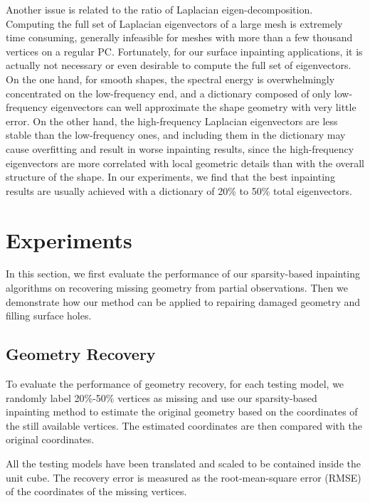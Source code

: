 Another issue is related to the ratio of Laplacian eigen-decomposition.
Computing the full set of Laplacian eigenvectors of a large mesh is
extremely time consuming, generally infeasible for meshes with more than a few
thousand vertices on a regular PC. Fortunately, for our surface inpainting
applications, it is actually not necessary or even desirable to compute the
full set of eigenvectors. On the one hand, for smooth shapes, the spectral
energy is overwhelmingly concentrated on the low-frequency end, and a
dictionary composed of only low-frequency eigenvectors can well approximate the
shape geometry with very little error. On the other hand, the high-frequency
Laplacian eigenvectors are less stable than the low-frequency ones, and
including them in the dictionary may cause overfitting and result in worse
inpainting results, since the high-frequency eigenvectors are more correlated
with local geometric details than with the overall structure of the shape. In
our experiments, we find that the best inpainting results are usually achieved
with a dictionary of 20\% to 50\% total eigenvectors.


\section{Experiments}
In this section, we first evaluate the performance of our sparsity-based
inpainting algorithms on recovering missing geometry from partial observations.
Then we demonstrate how our method can be applied to repairing damaged geometry
and filling surface holes.

\subsection{Geometry Recovery}
To evaluate the performance of geometry recovery, for each testing model, we
randomly label 20\%-50\% vertices as missing and use our sparsity-based
inpainting method to estimate the original geometry based on the coordinates of
the still available vertices. The estimated coordinates are then compared with
the original coordinates.

All the testing models have been translated and scaled to be contained inside
the unit cube. The recovery error is measured as the
root-mean-square error (RMSE) of the coordinates of the missing vertices.

